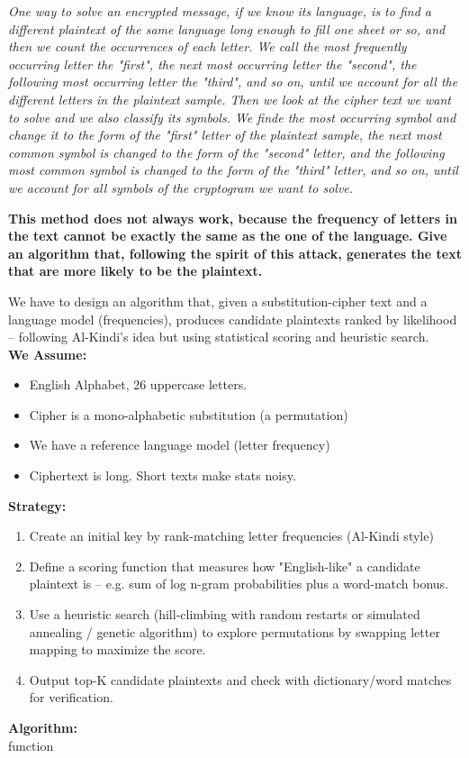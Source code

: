 \documentclass[]{article}
\numberwithin{figure}{section}
\begin{document}
\medskip

\noindent
\textit{One way to solve an encrypted message, if we know its language, is to find a different plaintext of the same language long enough to fill one sheet or so, and then we count the occurrences of each letter. We call the most frequently occurring letter the "first", the next most occurring letter the "second", the following most occurring letter the "third", and so on, until we account for all the different letters in the plaintext sample. Then we look at the cipher text we want to solve and we also classify its symbols. We finde the most occurring symbol and change it to the form of the "first" letter of the plaintext sample, the next most common symbol is changed to the form of the "second" letter, and the following most common symbol is changed to the form of the "third" letter, and so on, until we account for all symbols of the cryptogram we want to solve.} 

\medskip \noindent
\textbf{This method does not always work, because the frequency of letters in the text cannot be exactly the same as the one of the language. Give an algorithm that, following the spirit of this attack, generates the text that are more likely to be the plaintext.}

\medskip \noindent
We have to design an algorithm that, given a substitution-cipher text and a language model (frequencies), produces candidate plaintexts ranked by likelihood -- following Al-Kindi's idea but using statistical scoring and heuristic search. \\

\noindent \textbf{We Assume:} 
\begin{itemize}
	\item English Alphabet, 26 uppercase letters.
	\item Cipher is a mono-alphabetic substitution (a permutation)
	\item We have a reference language model (letter frequency)
	\item Ciphertext is long. Short texts make stats noisy.
\end{itemize} 
\textbf{Strategy:}
\begin{enumerate}
	\item Create an initial key by rank-matching letter frequencies (Al-Kindi style)
	\item Define a scoring function that measures how "English-like" a candidate plaintext is -- e.g. sum of log n-gram probabilities plus a word-match bonus.
	\item Use a heuristic search (hill-climbing with random restarts or simulated annealing / genetic algorithm) to explore permutations by swapping letter mapping to maximize the score.
	\item Output top-K candidate plaintexts and check with dictionary/word matches for verification.
\end{enumerate}
\textbf{Algorithm:} \\
function 
\end{document}
